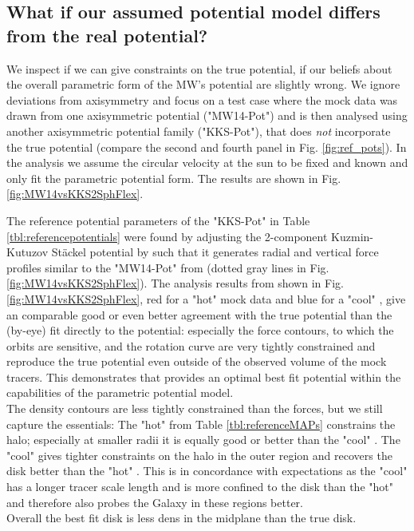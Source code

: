 \subsection{What if our assumed potential model differs from the real potential?} \label{sec:results_potential}


We inspect if we can give constraints on the true potential, if our beliefs about the overall parametric form of the MW's potential are slightly wrong. We ignore deviations from axisymmetry and focus on a test case where the mock data was drawn from one axisymmetric potential ("MW14-Pot") and is then analysed using another axisymmetric potential family ("KKS-Pot"), that does \emph{not} incorporate the true potential (compare the second and fourth panel in Fig. \ref{fig:ref_pots}). In the analysis we assume the circular velocity at the sun to be fixed and known and only fit the parametric potential form. The results are shown in Fig. \ref{fig:MW14vsKKS2SphFlex}.





The reference potential parameters of the "KKS-Pot" in Table \ref{tbl:referencepotentials} were found by adjusting the 2-component Kuzmin-Kutuzov St\"{a}ckel potential by \citet{bat94} such that it generates radial and vertical force profiles similar to the "MW14-Pot" from \citet{bov15} (dotted gray lines in Fig. \ref{fig:MW14vsKKS2SphFlex}). The analysis results from \RM shown in Fig. \ref{fig:MW14vsKKS2SphFlex}, red for a "hot" mock data \MAP and blue for a "cool" \MAP, give an comparable good or even better agreement with the true potential than the (by-eye) fit directly to the potential: especially the force contours, to which the orbits are sensitive, and the rotation curve are very tightly constrained and reproduce the true potential even outside of the observed volume of the mock tracers. This demonstrates that \RM provides an optimal best fit potential within the capabilities of the parametric potential model.
\\The density contours are less tightly constrained than the forces, but we still capture the essentials: The "hot" \MAP from Table \ref{tbl:referenceMAPs} constrains the halo; especially at smaller radii it is equally good or better than the "cool" \MAP. The "cool" \MAP gives tighter constraints on the halo in the outer region and recovers the disk better than the "hot" \MAP. This is in concordance with expectations as the "cool" \MAP has a longer tracer scale length and is more confined to the disk than the "hot" \MAP and therefore also probes the Galaxy in these regions better.
\\Overall the best fit disk is less dens in the midplane than the true disk. 

